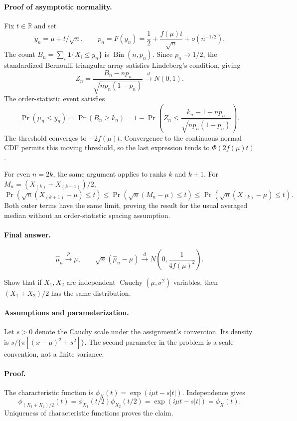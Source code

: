 \documentclass[answers,12pt,addpoints]{exam}
\providecommand{\R}{\mathbb{R}}
\providecommand{\ind}{\mathbf{1}}
\begin{document}
\begin{questions}
\begin{solution}
\paragraph{Proof of asymptotic normality.}
Fix $t\in\R$ and set
\[
y_n=\mu+t/\sqrt n,\qquad
p_n=F(y_n)=\frac12+\frac{f(\mu)t}{\sqrt n}+o(n^{-1/2}).
\]
The count $B_n=\sum_i\ind\{X_i\leq y_n\}$ is
$\operatorname{Bin}(n,p_n)$. Since $p_n\to1/2$, the standardized
Bernoulli triangular array satisfies Lindeberg's condition, giving
\[
Z_n=\frac{B_n-np_n}{\sqrt{np_n(1-p_n)}}\xrightarrow{d}N(0,1).
\]
The order-statistic event satisfies
\[
\Pr(\widehat\mu_n\leq y_n)
=\Pr(B_n\geq k_n)
=1-\Pr\left(Z_n\leq
\frac{k_n-1-np_n}{\sqrt{np_n(1-p_n)}}\right).
\]
The threshold converges to $-2f(\mu)t$. Convergence to the continuous
normal CDF permits this moving threshold, so the last expression
tends to $\Phi(2f(\mu)t)$.

For even $n=2k$, the same argument applies to ranks $k$ and $k+1$.
For $M_n=(X_{(k)}+X_{(k+1)})/2$,
\[
\Pr(\sqrt n(X_{(k+1)}-\mu)\leq t)
\leq\Pr(\sqrt n(M_n-\mu)\leq t)
\leq\Pr(\sqrt n(X_{(k)}-\mu)\leq t).
\]
Both outer terms have the same limit, proving the result for the
usual averaged median without an order-statistic spacing assumption.

\paragraph{Final answer.}
\[
\boxed{\widehat\mu_n\xrightarrow{p}\mu,\qquad
\sqrt n(\widehat\mu_n-\mu)\xrightarrow{d}
N\left(0,\frac1{4f(\mu)^2}\right).}
\]
\end{solution}

\question
Show that if $X_1,X_2$ are independent
$\operatorname{Cauchy}(\mu,\sigma^2)$ variables, then
$(X_1+X_2)/2$ has the same distribution.

\begin{solution}
\paragraph{Assumptions and parameterization.}
Let $s>0$ denote the Cauchy scale under the assignment's convention.
Its density is $s/\{\pi[(x-\mu)^2+s^2]\}$. The second parameter
in the problem is a scale convention, not a finite variance.

\paragraph{Proof.}
The characteristic function is $\phi_X(t)=\exp(i\mu t-s|t|)$.
Independence gives
\[
\phi_{(X_1+X_2)/2}(t)
=\phi_{X_1}(t/2)\phi_{X_2}(t/2)
=\exp(i\mu t-s|t|)=\phi_X(t).
\]
Uniqueness of characteristic functions proves the claim.


\end{solution}
\end{questions}
\end{document}
